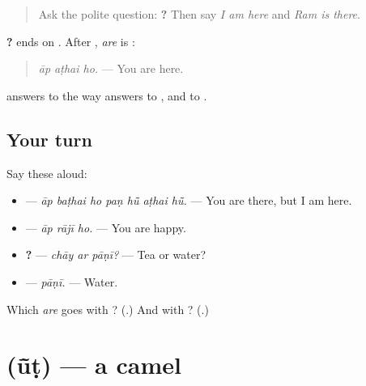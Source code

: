 \begin{quote}
Ask the polite question: \textbf{  ?} Then say \emph{I am here} and \emph{Ram is there}.
\end{quote}

\begin{grammarlens}[title={Grammar Lens: \mw{हो} after \mw{आप}}]
\textbf{  ?} ends on \textbf{}. After \textbf{}, \emph{are} is \textbf{}:

\begin{quote}
\textbf{  }
\end{quote}

\begin{quote}
\emph{āp aṭhai ho.} — You are here.
\end{quote}

\textbf{} answers to \textbf{} the way \textbf{} answers to \textbf{}, and \textbf{} to \textbf{}.
\end{grammarlens}

\subsection*{Your turn}
Say these aloud:

\begin{itemize}
\raggedright
  \item \textbf{      } — \emph{āp baṭhai ho paṇ hū̃ aṭhai hū̃.} — You are there, but I am here.
  \item \textbf{  } — \emph{āp rājī ho.} — You are happy.
  \item \textbf{  ?} — \emph{chāy ar pāṇī?} — Tea or water?
  \item \textbf{} — \emph{pāṇī.} — Water.
\end{itemize}

\begin{tcolorbox}[breakable,colback=teal!4,colframe=teal!35!black,title={Before you move on}]
Which \emph{are} goes with \textbf{}? (\textbf{}.) And with \textbf{}? (\textbf{}.)
\end{tcolorbox}
\section[\texorpdfstring{\mw{ऊंट} (ū̃ṭ)}{ऊंट (ū̃ṭ)}]{ (ū̃ṭ) — a camel}

